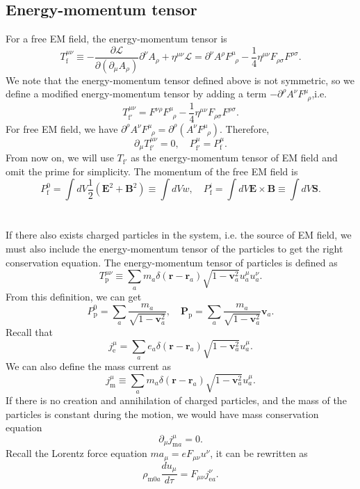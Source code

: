 \subsection{Energy-momentum tensor}
For a free EM field, the energy-momentum tensor is
\[T_{\mathrm{f}}^{\mu \nu} \equiv -\frac{\partial \mathcal{L}}{\partial(\partial_{\mu}A_{\rho})} \partial^{\nu} A_{\rho} + \eta^{\mu \nu} \mathcal{L} = \partial^{\nu}A^{\rho} F^{\mu}_{\phantom{\rho}\rho}-\frac{1}{4}\eta^{\mu\nu}F_{\rho\sigma}F^{\rho\sigma}.\]
We note that the energy-momentum tensor defined above is not symmetric, so we define a modified energy-momentum tensor by adding a term $-\partial^{\rho}A^{\nu}F^{\mu}_{\phantom{\rho}\rho}$,i.e.
\[T_{\mathrm{f}'}^{\mu\nu} = F^{\nu\rho}F^{\mu}_{\phantom{\rho}\rho}-\frac{1}{4}\eta^{\mu\nu}F_{\rho\sigma}F^{\rho\sigma}.\]
For free EM field, we have $\partial^{\rho}A^{\nu}F^{\mu}_{\phantom{\rho}\rho} = \partial^{\rho}\left(A^{\nu} F^{\mu}_{\phantom{\rho}\rho}\right)$.
Therefore,
\[\partial_{\mu}T_{\mathrm{f}'}^{\mu\nu} = 0 , \quad P_{\mathrm{f}'}^{\mu} = P_{\mathrm{f}}^{\mu}.\]
From now on, we will use $T_{\mathrm{f}'}$ as the energy-momentum tensor of EM field and omit the prime for simplicity.
The momentum of the free EM field is
\[P_{\mathrm{f}}^{0} = \int dV \frac{1}{2}(\bm{E}^2+\bm{B}^2) \equiv \int dV w , \quad P_{\mathrm{f}}^{i} = \int dV \bm{E} \times \bm{B} \equiv \int dV \bm{S}.\]
\\ \\
If there also exists charged particles in the system, i.e. the source of EM field, we must also include the energy-momentum tensor of the particles to get the right conservation equation. The energy-momentum tensor of particles is defined as
\[T_{\mathrm{p}}^{\mu\nu} \equiv \sum_a m_a \delta(\bm{r}-\bm{r}_a) \sqrt{1-\bm{v}_a^2} u_a^\mu u_a^{\nu}.\]
From this definition, we can get
\[P_{\mathrm{p}}^0 = \sum_a \frac{m_a}{\sqrt{1-\bm{v}_a^2}} , \quad \bm{P}_{\mathrm{p}} =  \sum_a \frac{m_a}{\sqrt{1-\bm{v}_a^2}} \bm{v}_a.\]
Recall that
\[j^{\mu}_{\mathrm{e}} = \sum_a e_a \delta(\bm{r}-\bm{r}_a) \sqrt{1-\bm{v}_a^2} u_a^\mu .\]
We can also define the mass current as
\[j^{\mu}_{\mathrm{m}} \equiv \sum_a m_a \delta(\bm{r}-\bm{r}_a) \sqrt{1-\bm{v}_a^2} u_a^\mu .\]
If there is no creation and annihilation of charged particles, and the mass of the particles is constant during the motion, we would have mass conservation equation
\[\partial_{\mu} j^{\mu}_{\mathrm{m}a} = 0.\]
Recall the Lorentz force equation $m a_{\mu} = eF_{\mu\nu}u^{\nu}$, it can be rewritten as
\[\rho_{\mathrm{m}0a} \frac{du_{\mu}}{d\tau} = F_{\mu\nu}j_{\mathrm{e}a}^{\nu}.\]
